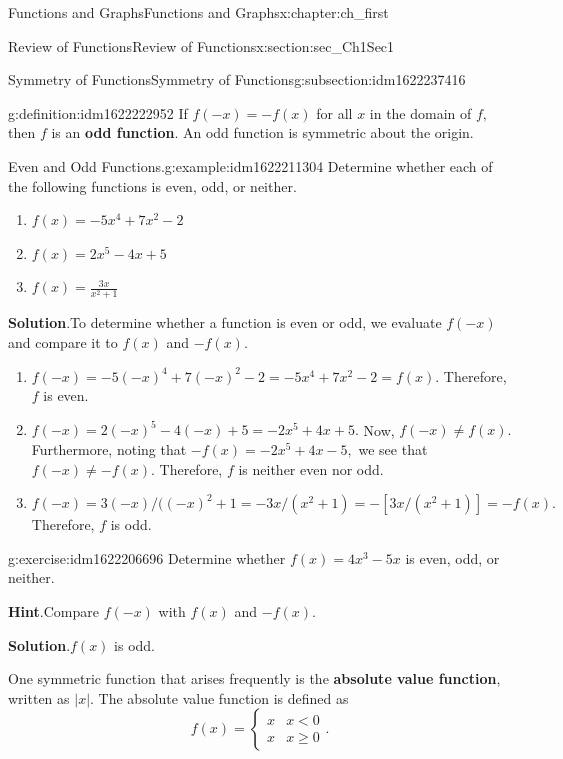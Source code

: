 \documentclass[oneside,10pt,]{book}
\newcommand{\blocktitlefont}{\relax}
\newcommand{\terminology}[1]{\textbf{#1}}
\numberwithin{equation}{section}
\newcommand{\lt}{<}
\newcommand{\amp}{&}
\begin{document}
\begin{chapterptx}{Functions and Graphs}{}{Functions and Graphs}{}{}{x:chapter:ch_first}
\begin{sectionptx}{Review of Functions}{}{Review of Functions}{}{}{x:section:sec_Ch1Sec1}
\begin{subsectionptx}{Symmetry of Functions}{}{Symmetry of Functions}{}{}{g:subsection:idm1622237416}
\begin{definition}{}{g:definition:idm1622222952}
If \(f(-x)=-f(x)\) for all \(x\) in the domain of \(f,\) then \(f\) is an \terminology{odd function}. An odd function is symmetric about the origin.%
\end{definition}
\begin{example}{Even and Odd Functions.}{g:example:idm1622211304}%
Determine whether each of the following functions is even, odd, or neither.%
%
\begin{enumerate}
\item{}\(\displaystyle f(x)=-5x^4+7x^2-2\)%
\item{}\(\displaystyle f(x)=2x^5-4x+5\)%
\item{}\(\displaystyle f(x)=\frac{3x}{x^2+1}\)%
\end{enumerate}
\par\smallskip%
\noindent\textbf{\blocktitlefont Solution}.\hypertarget{g:solution:idm1622211560}{}\quad{}To determine whether a function is even or odd, we evaluate \(f(-x)\) and compare it to \(f(x)\) and \(-f(x).\)%
%
\begin{enumerate}
\item{}\(f(-x)=-5(-x)^4+7(-x)^2-2=-5x^4+7x^2-2=f(x).\) Therefore, \(f\) is even.%
\item{}\(f(-x)=2(-x)^5-4(-x)+5=-2x^5+4x+5.\) Now, \(f(-x)\neq f(x).\) Furthermore, noting that \(-f(x)=-2x^5+4x-5,\) we see that \(f(-x)\neq-f(x).\) Therefore, \(f\) is neither even nor odd.%
\item{}\(f(-x)=3(-x)/((-x)^2+1=-3x/(x^2+1)=-[3x/(x^2+1)]=-f(x).\) Therefore, \(f\) is odd.%
\end{enumerate}
\end{example}
\begin{inlineexercise}{}{g:exercise:idm1622206696}%
Determine whether \(f(x)=4x^3-5x\) is even, odd, or neither.%
\par\smallskip%
\noindent\textbf{\blocktitlefont Hint}.\hypertarget{g:hint:idm1622206056}{}\quad{}Compare \(f(-x)\) with \(f(x)\) and \(-f(x).\)%
\par\smallskip%
\noindent\textbf{\blocktitlefont Solution}.\hypertarget{g:solution:idm1622204264}{}\quad{}\(f(x)\) is odd.%
\end{inlineexercise}%
One symmetric function that arises frequently is the \terminology{absolute value function}, written as \(|x|.\) The absolute value function is defined as%
%
\begin{equation*}
f(x)=\begin{cases}x \amp x \lt 0 \\ x \amp x \geq 0\end{cases}\text{.}

\end{equation*}
\end{subsectionptx}
\end{sectionptx}
\end{chapterptx}
\end{document}
